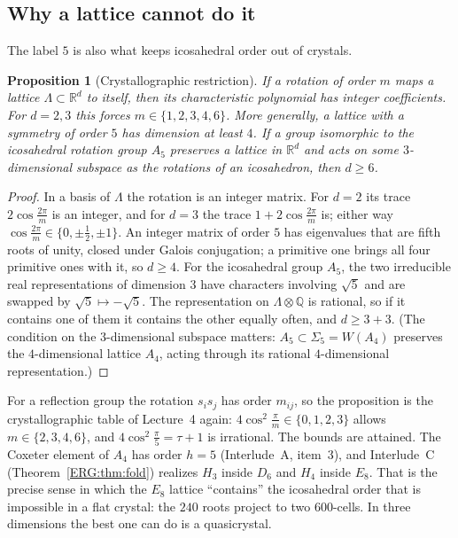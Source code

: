 \documentclass[11pt,openany]{book}
\theoremstyle{plain}
\newtheorem{proposition}[theorem]{Proposition}
\theoremstyle{definition}
\theoremstyle{remark}
\newcommand{\R}{\mathbb{R}}
\newcommand{\Q}{\mathbb{Q}}
\newcommand{\Lat}{\Lambda}             %
\begin{document}
\subsection*{Why a lattice cannot do it}
The label $5$ is also what keeps icosahedral order out of crystals.

\begin{proposition}[Crystallographic restriction]\label{DYN:prop:cryst}
If a rotation of order $m$ maps a lattice $\Lat\subset\R^d$ to itself, then its characteristic
polynomial has integer coefficients. For $d=2,3$ this forces $m\in\{1,2,3,4,6\}$. More generally, a
lattice with a symmetry of order $5$ has dimension at least $4$. If a group isomorphic to the icosahedral
rotation group $A_5$ preserves a lattice in $\R^d$ and acts on some $3$-dimensional subspace as the
rotations of an icosahedron, then $d\ge6$.
\end{proposition}

\begin{proof}
In a basis of $\Lat$ the rotation is an integer matrix. For $d=2$ its trace $2\cos\frac{2\pi}m$ is an
integer, and for $d=3$ the trace $1+2\cos\frac{2\pi}m$ is; either way
$\cos\frac{2\pi}m\in\{0,\pm\frac12,\pm1\}$. An integer matrix of order $5$ has eigenvalues that are fifth
roots of unity, closed under Galois conjugation; a primitive one brings all four primitive ones with it,
so $d\ge4$. For the icosahedral group $A_5$, the two irreducible real representations of dimension $3$ have
characters involving $\sqrt5$ and are swapped by $\sqrt5\mapsto-\sqrt5$. The representation on
$\Lat\otimes\Q$ is rational, so if it contains one of them it contains the other equally often, and
$d\ge3+3$. (The condition on the $3$-dimensional subspace matters: $A_5\subset\Sigma_5=W(A_4)$ preserves the
$4$-dimensional lattice $A_4$, acting through its rational $4$-dimensional representation.)
\end{proof}

For a reflection group the rotation $s_is_j$ has order $m_{ij}$, so the proposition is the
crystallographic table of Lecture~4 again: $4\cos^2\frac\pi m\in\{0,1,2,3\}$ allows
$m\in\{2,3,4,6\}$, and $4\cos^2\frac\pi5=\tau+1$ is irrational. The bounds are attained. The Coxeter
element of $A_4$ has order $h=5$ (Interlude~A, item~3), and Interlude~C (Theorem~\ref{ERG:thm:fold})
realizes $H_3$ inside $D_6$ and $H_4$ inside $E_8$. That is the precise sense in which the $E_8$ lattice
``contains'' the icosahedral order that is impossible in a flat crystal: the $240$ roots project to two
$600$-cells. In three dimensions the best one can do is a quasicrystal.
\end{document}
